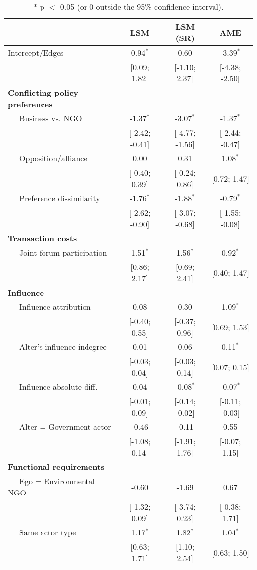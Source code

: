 \begin{table}[ht]
\centering
\begingroup\tiny
\begin{tabular}{lccc}
   & LSM & LSM (SR) & AME \\ 
  \hline
\hline
Intercept/Edges & 0.94$^{\ast}$ & 0.60 & -3.39$^{\ast}$ \\ 
   & [0.09; 1.82] & [-1.10; 2.37] & [-4.38; -2.50] \\ 
  \textbf{Conflicting policy preferences} &  &  &  \\ 
  $\;\;\;\;$ Business vs. NGO & -1.37$^{\ast}$ & -3.07$^{\ast}$ & -1.37$^{\ast}$ \\ 
   & [-2.42; -0.41] & [-4.77; -1.56] & [-2.44; -0.47] \\ 
  $\;\;\;\;$ Opposition/alliance & 0.00 & 0.31 & 1.08$^{\ast}$ \\ 
   & [-0.40; 0.39] & [-0.24; 0.86] & [0.72; 1.47] \\ 
  $\;\;\;\;$ Preference dissimilarity & -1.76$^{\ast}$ & -1.88$^{\ast}$ & -0.79$^{\ast}$ \\ 
   & [-2.62; -0.90] & [-3.07; -0.68] & [-1.55; -0.08] \\ 
  \textbf{Transaction costs} &  &  &  \\ 
  $\;\;\;\;$ Joint forum participation & 1.51$^{\ast}$ & 1.56$^{\ast}$ & 0.92$^{\ast}$ \\ 
   & [0.86; 2.17] & [0.69; 2.41] & [0.40; 1.47] \\ 
  \textbf{Influence} &  &  &  \\ 
  $\;\;\;\;$ Influence attribution & 0.08 & 0.30 & 1.09$^{\ast}$ \\ 
   & [-0.40; 0.55] & [-0.37; 0.96] & [0.69; 1.53] \\ 
  $\;\;\;\;$ Alter's influence indegree & 0.01 & 0.06 & 0.11$^{\ast}$ \\ 
   & [-0.03; 0.04] & [-0.03; 0.14] & [0.07; 0.15] \\ 
  $\;\;\;\;$ Influence absolute diff. & 0.04 & -0.08$^{\ast}$ & -0.07$^{\ast}$ \\ 
   & [-0.01; 0.09] & [-0.14; -0.02] & [-0.11; -0.03] \\ 
  $\;\;\;\;$ Alter = Government actor & -0.46 & -0.11 & 0.55 \\ 
   & [-1.08; 0.14] & [-1.91; 1.76] & [-0.07; 1.15] \\ 
  \textbf{Functional requirements} &  &  &  \\ 
  $\;\;\;\;$ Ego = Environmental NGO & -0.60 & -1.69 & 0.67 \\ 
   & [-1.32; 0.09] & [-3.74; 0.23] & [-0.38; 1.71] \\ 
  $\;\;\;\;$ Same actor type & 1.17$^{\ast}$ & 1.82$^{\ast}$ & 1.04$^{\ast}$ \\ 
   & [0.63; 1.71] & [1.10; 2.54] & [0.63; 1.50] \\ 
   \hline
\hline
\end{tabular}
\endgroup
\caption{* p $<$ 0.05 (or 0 outside the 95\% confidence interval).} 
\label{tab:regTable_latSpace}
\end{table}
